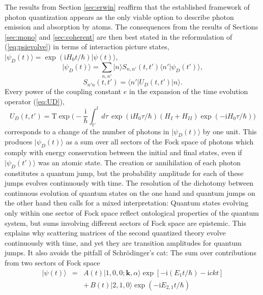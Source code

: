\documentclass[final,3p,12pt]{elsarticle3}
\begin{document}
The results from Section \ref{sec:erwin} reaffirm that the established framework 
of photon quantization appears as the only viable option to describe photon 
emission and absorption by atoms. The consequences from the results of 
Sections \ref{sec:mono} and \ref{sec:coherent} are then best stated in the 
reformulation of (\ref{eq:psievolve}) in terms of interaction picture 
states, $\bm{|}\psi_D(t)\bm{\rangle}=\exp(\mathrm{i}H_0t/\hbar)\bm{|}\psi(t)\bm{\rangle}$,
\begin{equation}\label{eq:psievolveD}
\bm{|}\psi_D(t)\bm{\rangle}=\sum_{n,n'}\bm{|}n\bm{\rangle} S_{n,n'}(t,t')
\bm{\langle} n'\bm{|}\psi_D(t')\bm{\rangle},
\end{equation}
\[
S_{n'n}(t,t')=\bm{\langle} n'\bm{|}U_D(t,t')\bm{|}n\bm{\rangle}.
\]
Every power of the coupling constant $e$ in the expansion of the time evolution 
operator (\ref{eq:UD}),
\begin{equation}
U_D(t,t')=\mathrm{T}\exp\bigg(-\frac{\mathrm{i}}{\hbar}\int_{t'}^t\!d\tau\,
\exp(\mathrm{i}H_0\tau/\hbar)
\label{eq:UD2}
(H_I+H_{II})\exp(-\mathrm{i}H_0\tau/\hbar)\bigg)
\end{equation}
corresponds to a change of the number of photons in $\bm{|}\psi_D(t)\bm{\rangle}$ by 
one unit. This produces $\bm{|}\psi_D(t)\bm{\rangle}$ as a sum over all sectors of 
the Fock space of photons which comply with energy conservation between the initial 
and final states, even if $\bm{|}\psi_D(t')\bm{\rangle}$ was an atomic state. The 
creation or annihilation of each photon constitutes a quantum jump, but the 
probability amplitude for each of these jumps evolves continuously with time.
The resolution of the dichotomy between continuous evolution of quantum states
on the one hand and quantum jumps on the other hand then calls for a mixed
interpretation: Quantum states evolving only within one sector of Fock space
reflect ontological properties of the quantum system, but sums involving different 
sectors of Fock space are epistemic. This explains why scattering matrices of the 
second quantized theory evolve continuously with time, and yet they are transition 
amplitudes for quantum jumps. It also avoids the pitfall of Schr\"odinger's cat:
The sum over contributions from two sectors of Fock space
\begin{eqnarray}\nonumber
\bm{|}\psi(t)\bm{\rangle}&=&A(t)\bm{|}1,0,0;\bm{k},\alpha\bm{\rangle}
\exp[-\mathrm{i}(E_{1}t/\hbar)-\mathrm{i}ckt]
\\ \label{eq:psi2}
&&+\,B(t)\bm{|}2,1,0\bm{\rangle}\exp(-\mathrm{i}E_{2,1}t/\hbar)
\end{eqnarray}
\end{document}
